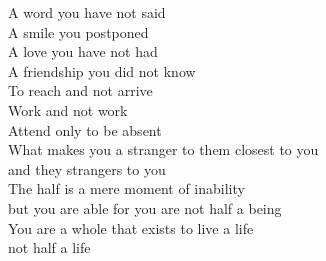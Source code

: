 \begin{Parallel}{0.48\textwidth}{0.48\textwidth}
{A word you have not said\\
A smile you postponed\\
A love you have not had\\
A friendship you did not know\\
To reach and not arrive\\
Work and not work\\
Attend only to be absent\\
What makes you a stranger to them closest to you\\
and they strangers to you\\
The half is a mere moment of inability\\
but you are able for you are not half a being\\
You are a whole that exists to live a life\\
not half a life}
\ParallelPar
\end{Parallel}